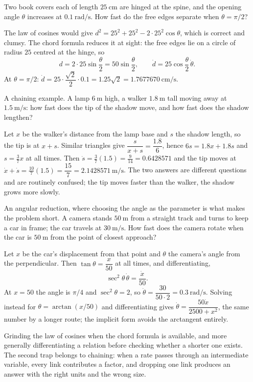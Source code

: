 \begin{worked}
Two book covers each of length $25\ \mathrm{cm}$ are hinged at the spine, and the opening angle $\theta$ increases at $0.1\ \mathrm{rad/s}$. How fast do the free edges separate when $\theta=\pi/2$?

The law of cosines would give $d^{2}=25^{2}+25^{2}-2\cdot25^{2}\cos\theta$, which is correct and clumsy. The chord formula reduces it at sight: the free edges lie on a circle of radius $25$ centred at the hinge, so
\[
d=2\cdot25\sin\frac{\theta}{2}=50\sin\frac\theta2,\qquad \dot d=25\cos\frac\theta2\,\dot\theta .
\]
At $\theta=\pi/2$: $\dot d=25\cdot\dfrac{\sqrt2}{2}\cdot0.1=1.25\sqrt2=1.7677670\ \mathrm{cm/s}$.

A chaining example. A lamp $6\ \mathrm{m}$ high, a walker $1.8\ \mathrm{m}$ tall moving away at $1.5\ \mathrm{m/s}$: how fast does the tip of the shadow move, and how fast does the shadow lengthen?

Let $x$ be the walker's distance from the lamp base and $s$ the shadow length, so the tip is at $x+s$. Similar triangles give $\dfrac{s}{x+s}=\dfrac{1.8}{6}$, hence $6s=1.8x+1.8s$ and $s=\tfrac37x$ at all times. Then $\dot s=\tfrac37(1.5)=\tfrac{9}{14}=0.6428571$ and the tip moves at $\dot x+\dot s=\tfrac{10}{7}(1.5)=\dfrac{15}{7}=2.1428571\ \mathrm{m/s}$. The two answers are different questions and are routinely confused; the tip moves faster than the walker, the shadow grows more slowly.

An angular reduction, where choosing the angle as the parameter is what makes the problem short. A camera stands $50\ \mathrm{m}$ from a straight track and turns to keep a car in frame; the car travels at $30\ \mathrm{m/s}$. How fast does the camera rotate when the car is $50\ \mathrm{m}$ from the point of closest approach?

Let $x$ be the car's displacement from that point and $\theta$ the camera's angle from the perpendicular. Then $\tan\theta=\dfrac{x}{50}$ at all times, and differentiating,
\[
\sec^{2}\theta\,\dot\theta=\frac{\dot x}{50}.
\]
At $x=50$ the angle is $\pi/4$ and $\sec^{2}\theta=2$, so $\dot\theta=\dfrac{30}{50\cdot2}=0.3\ \mathrm{rad/s}$. Solving instead for $\theta=\arctan(x/50)$ and differentiating gives $\dot\theta=\dfrac{50\dot x}{2500+x^{2}}$, the same number by a longer route; the implicit form avoids the arctangent entirely.
\end{worked}

\begin{trap}
Grinding the law of cosines when the chord formula is available, and more generally differentiating a relation before checking whether a shorter one exists. The second trap belongs to chaining: when a rate passes through an intermediate variable, every link contributes a factor, and dropping one link produces an answer with the right units and the wrong size.
\end{trap}

